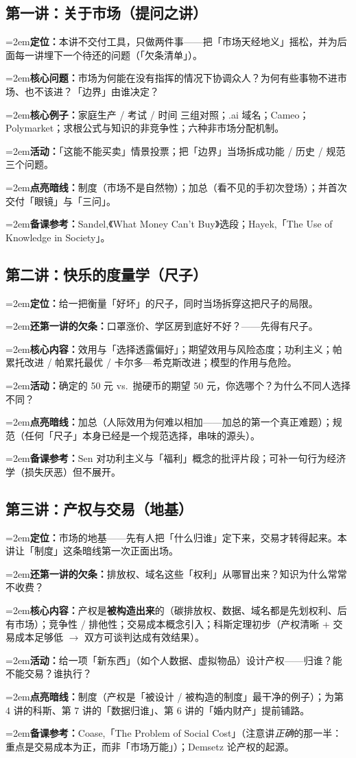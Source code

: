 \documentclass[10pt,a4paper]{ctexart}
\newcommand{\field}[1]{\par\noindent\hangindent=2em\textbf{#1}\hspace{0.3em}}
\begin{document}
\subsection{第一讲：关于市场（提问之讲）}
\field{定位：}本讲不交付工具，只做两件事——把「市场天经地义」摇松，并为后面每一讲埋下一个待还的问题（「欠条清单」）。
\field{核心问题：}市场为何能在没有指挥的情况下协调众人？为何有些事物不进市场、也不该进？「边界」由谁决定？
\field{核心例子：}家庭生产 / 考试 / 时间 三组对照；.ai 域名；Cameo；Polymarket；求根公式与知识的非竞争性；六种非市场分配机制。
\field{活动：}「这能不能买卖」情景投票；把「边界」当场拆成功能 / 历史 / 规范三个问题。
\field{点亮暗线：}制度（市场不是自然物）；加总（看不见的手初次登场）；并首次交付「眼镜」与「三问」。
\field{备课参考：}Sandel,《What Money Can't Buy》选段；Hayek,「The Use of Knowledge in Society」。

\subsection{第二讲：快乐的度量学（尺子）}
\field{定位：}给一把衡量「好坏」的尺子，同时当场拆穿这把尺子的局限。
\field{还第一讲的欠条：}口罩涨价、学区房到底好不好？——先得有尺子。
\field{核心内容：}效用与「选择透露偏好」；期望效用与风险态度；功利主义；帕累托改进 / 帕累托最优 / 卡尔多—希克斯改进；模型的作用与危险。
\field{活动：}确定的 50 元 vs.\ 抛硬币的期望 50 元，你选哪个？为什么不同人选择不同？
\field{点亮暗线：}加总（人际效用为何难以相加——加总的第一个真正难题）；规范（任何「尺子」本身已经是一个规范选择，串味的源头）。
\field{备课参考：}Sen 对功利主义与「福利」概念的批评片段；可补一句行为经济学（损失厌恶）但不展开。

\subsection{第三讲：产权与交易（地基）}
\field{定位：}市场的地基——先有人把「什么归谁」定下来，交易才转得起来。本讲让「制度」这条暗线第一次正面出场。
\field{还第一讲的欠条：}排放权、域名这些「权利」从哪冒出来？知识为什么常常不收费？
\field{核心内容：}产权是\textbf{被构造出来}的（碳排放权、数据、域名都是先划权利、后有市场）；竞争性 / 排他性；交易成本概念引入；科斯定理初步（产权清晰 + 交易成本足够低 $\to$ 双方可谈判达成有效结果）。
\field{活动：}给一项「新东西」（如个人数据、虚拟物品）设计产权——归谁？能不能交易？谁执行？
\field{点亮暗线：}制度（产权是「被设计 / 被构造的制度」最干净的例子）；为第 4 讲的科斯、第 7 讲的「数据归谁」、第 6 讲的「婚内财产」提前铺路。
\field{备课参考：}Coase,「The Problem of Social Cost」（注意讲\emph{正确}的那一半：重点是交易成本为正，而非「市场万能」）；Demsetz 论产权的起源。
\end{document}
